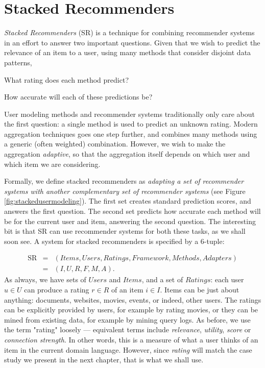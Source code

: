 \section{Stacked Recommenders}
\label{sec:usermetamodeling}

\emph{Stacked Recommenders} (SR) is a technique for combining recommender systems
in an effort to answer two important questions.
Given that we wish to predict the relevance of an item to a user,
using many methods that consider disjoint data patterns,

\begin{enumerate*}
  \item What rating does each method predict?
  \item How accurate will each of these predictions be?
\end{enumerate*}

User modeling methods and recommender systems traditionally only care about the first question:
a single method is used to predict an unknown rating.
Modern aggregation techniques goes one step further, and combines many methods using a generic (often weighted) combination.
However, we wish to make the aggregation \emph{adaptive},
so that the aggregation itself depends on which user and which item we are considering.

Formally, we define stacked recommenders as \emph{adapting a set of recommender systems
with another complementary set of recommender systems} 
(see Figure \ref{fig:stackedusermodeling}).
The first set creates standard prediction scores, and answers the first question.
The second set predicts how accurate each method will be for the current user and item,
answering the second question.
The interesting bit is that SR can use recommender systems for both these tasks, as we shall soon see.
A system for stacked recommenders is specified by a 6-tuple:

\begin{eqnarray*}
  \mathrm{SR} &=& (Items, Users, Ratings, Framework, Methods, Adapters)\\
              &=& (I,U,R,F,M,A).
\end{eqnarray*}
%
As always, we have sets of $Users$ and $Items$, 
and a set of $Ratings$: each user $u \in U$ can produce a rating $r \in R$ of an item $i \in I$.
Items can be just about anything: documents, websites, movies, events, or indeed, other users.
The ratings can be explicitly provided by users, for example by rating movies,
or they can be mined from existing data, for example by mining query logs.
As before, we use the term "rating" loosely --- equivalent terms include \emph{relevance}, \emph{utility},
\emph{score} or \emph{connection strength}. In other words, this is a measure of what a user thinks of an item
in the current domain language. However, since \emph{rating} will match the case study we present in the next chapter,
that is what we shall use. 

